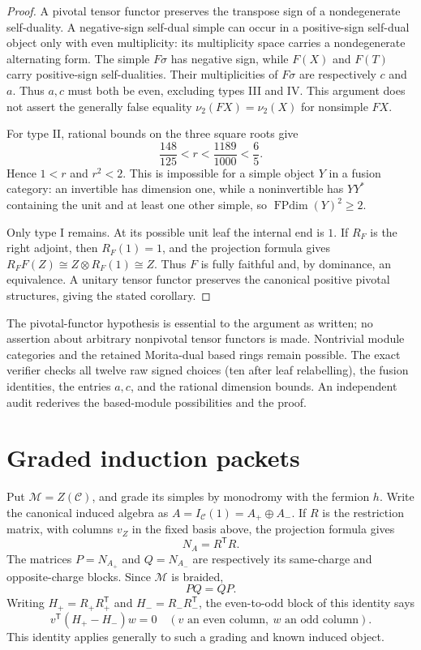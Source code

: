 \documentclass[10pt]{article}
\newcommand{\FPdim}{\operatorname{FPdim}}
\newcommand{\C}{\mathcal C}
\newcommand{\M}{\mathcal M}
\begin{document}
\begin{proof}
A pivotal tensor functor preserves the transpose sign of a nondegenerate self-duality. A negative-sign self-dual simple can occur in a positive-sign self-dual object only with even multiplicity: its multiplicity space carries a nondegenerate alternating form. The simple $F\sigma$ has negative sign, while $F(X)$ and $F(T)$ carry positive-sign self-dualities. Their multiplicities of $F\sigma$ are respectively $c$ and $a$. Thus $a,c$ must both be even, excluding types III and IV. This argument does not assert the generally false equality $\nu_2(FX)=\nu_2(X)$ for nonsimple $FX$.

For type II, rational bounds on the three square roots give
\[
 \frac{148}{125}<r<\frac{1189}{1000}<\frac65.
\]
Hence $1<r$ and $r^2<2$. This is impossible for a simple object $Y$ in a fusion category: an invertible has dimension one, while a noninvertible has $YY^*$ containing the unit and at least one other simple, so $\FPdim(Y)^2\ge2$.

Only type I remains. At its possible unit leaf the internal end is $1$. If $R_F$ is the right adjoint, then $R_F(1)=1$, and the projection formula gives $R_FF(Z)\cong Z\otimes R_F(1)\cong Z$. Thus $F$ is fully faithful and, by dominance, an equivalence. A unitary tensor functor preserves the canonical positive pivotal structures, giving the stated corollary.
\end{proof}

The pivotal-functor hypothesis is essential to the argument as written; no assertion about arbitrary nonpivotal tensor functors is made. Nontrivial module categories and the retained Morita-dual based rings remain possible. The exact verifier checks all twelve raw signed choices (ten after leaf relabelling), the fusion identities, the entries $a,c$, and the rational dimension bounds. An independent audit rederives the based-module possibilities and the proof.

\section{Graded induction packets}
Put $\M=Z(\C)$, and grade its simples by monodromy with the fermion $h$. Write the canonical induced algebra as $A=I_{\C}(1)=A_+\oplus A_-$. If $R$ is the restriction matrix, with columns $v_Z$ in the fixed basis above, the projection formula gives
\[
 N_A=R^{\mathsf T}R.
\]
The matrices $P=N_{A_+}$ and $Q=N_{A_-}$ are respectively its same-charge and opposite-charge blocks. Since $\M$ is braided,
\begin{equation}\label{eq:commute}
 PQ=QP.
\end{equation}
Writing $H_+=R_+R_+^{\mathsf T}$ and $H_-=R_-R_-^{\mathsf T}$, the even-to-odd block of this identity says
\begin{equation}\label{eq:gramcommute}
 v^{\mathsf T}(H_+-H_-)w=0
 \quad(v\text{ an even column},\ w\text{ an odd column}).
\end{equation}
This identity applies generally to such a grading and known induced object.
\end{document}
